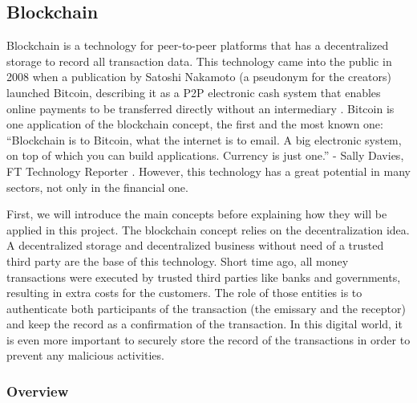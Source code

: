 \subsection{Blockchain}

Blockchain is a technology for peer-to-peer platforms that has a decentralized storage to record all transaction data. This technology came into the public in 2008  when a publication by Satoshi Nakamoto (a pseudonym for the creators)  launched Bitcoin, describing it as a \ac{P2P} electronic cash system that enables online payments to be transferred directly without an intermediary \cite{bitcoin}. Bitcoin is one application of the blockchain concept, the first and the most known one:  “Blockchain is to Bitcoin, what the internet is to email. A big electronic system, on top of which you can build applications. Currency is just one.” - Sally Davies, FT Technology Reporter \cite{Howbitcoinanditsblockchainwork}. However, this technology has a great potential in many sectors, not only in the financial one.


First, we will introduce the main concepts before explaining how they will be applied in this project. The blockchain concept relies on the decentralization idea. A decentralized storage and decentralized business without need of a trusted third party are the base of this technology. Short time ago, all money transactions were executed by trusted third parties like banks and governments, resulting in extra costs for the customers. The role of those entities is to authenticate both participants of the transaction (the emissary and the receptor) and keep the record as a confirmation of the transaction. In this digital world, it is even more important to securely store the record of the transactions in order to prevent any malicious activities. 



\subsubsection{Overview}


